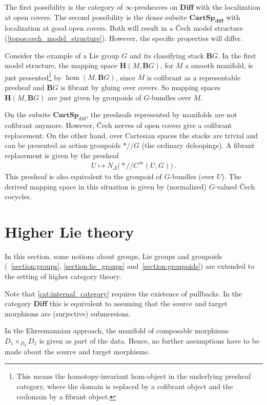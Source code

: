     The first possibility is the category of $\infty$-presheaves on $\mathbf{Diff}$ with the localization at open covers. The second possibility is the dense subsite $\mathbf{CartSp_{\text{diff}}}$ with localization at good open covers. Both will result in a \v{C}ech model structure (\cref{topos:cech_model_structure}). However, the specific properties will differ.

    \begin{example}
        Consider the example of a Lie group $G$ and its classifying stack $\mathbf{B}G$. In the first model structure, the mapping space $\mathbf{H}(M,\mathbf{B}G)$, for $M$ a smooth manifold, is just presented\footnote{This means the homotopy-invariant hom-object in the underlying presheaf category, where the domain is replaced by a cofibrant object and the codomain by a fibrant object.} by $\hom(M,\mathbf{B}G)$, since $M$ is cofibrant as a representable presheaf and $\mathbf{B}G$ is fibrant by gluing over covers. So mapping spaces $\mathbf{H}(M,\mathbf{B}G)$ are just given by groupoids of $G$-bundles over $M$.

        On the subsite $\mathbf{CartSp}_{\text{diff}}$, the presheafs represented by manifolds are not cofibrant anymore. However, \v{C}ech nerves of open covers give a cofibrant replacement. On the other hand, over Cartesian spaces the stacks are trivial and can be presented as action groupoids $\ast/\!\!/G$ (the ordinary deloopings). A fibrant replacement is given by the presheaf
        \begin{gather}
            U\mapsto N_\Delta\bigl(\ast/\!\!/C^\infty(U,G)\bigr)\,.
        \end{gather}
        This presheaf is also equivalent to the groupoid of $G$-bundles (over $U$). The derived mapping space in this situation is given by (normalized) $G$-valued \v{C}ech cocycles.
    \end{example}

\section{Higher Lie theory}

    In this section, some notions about groups, Lie groups and groupoids (~\ref{section:groups}, \ref{section:lie_groups} and~\ref{section:groupoids}) are extended to the setting of higher category theory.

    \begin{remark}
        Note that \cref{cat:internal_category} requires the existence of pullbacks. In the category $\mathbf{Diff}$ this is equivalent to assuming that the source and target morphisms are (surjective) submersions.

        In the Ehresmannian approach, the manifold of composable morphisms $D_1\times_{D_0}D_1$ is given as part of the data. Hence, no further assumptions have to be made about the source and target morphisms.
    \end{remark}

